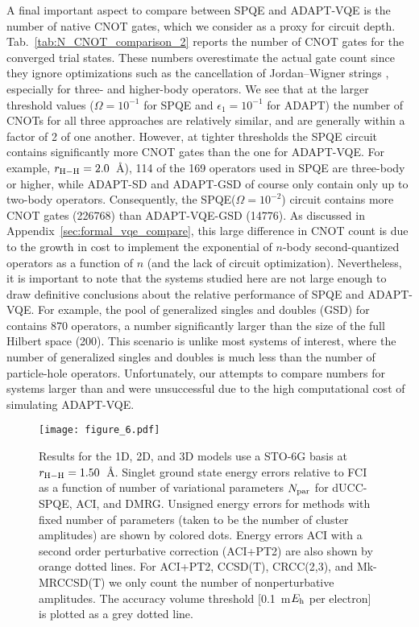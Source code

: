 \documentclass[aps,prx, reprint]{revtex4-2}
\newcommand*{\Eh}{$E_{\rm h}$\xspace}
\begin{document}
A final important aspect to compare between SPQE and ADAPT-VQE is the number of native CNOT gates, which we consider as a proxy for circuit depth.
Tab.~\ref{tab:N_CNOT_comparison_2} reports the number of CNOT gates for the converged trial states.
These numbers overestimate the actual gate count since they ignore optimizations such as the cancellation of Jordan--Wigner strings \cite{Haystings2015Improving}, especially for three- and higher-body operators.
We see that at the larger threshold values ($\Omega=10^{-1}$ for SPQE and $\epsilon_1=10^{-1}$ for ADAPT) the number of CNOTs for all three approaches are relatively similar, and are generally within a factor of 2 of one another.
However, at tighter thresholds the SPQE circuit contains significantly more CNOT gates than the one for ADAPT-VQE.
For example, $r_{\rm{H-H}} = 2.0$~{\AA}), 114 of the 169 operators used in SPQE are three-body or higher, while ADAPT-SD and ADAPT-GSD of course only contain only up to two-body operators.
Consequently, the SPQE($\Omega=10^{-2}$) circuit contains more CNOT gates (226768) than ADAPT-VQE-GSD  (14776).
As discussed in Appendix~\ref{sec:formal_vqe_compare}, this large difference in CNOT count is due to the growth in cost to implement the exponential of $n$-body second-quantized operators as a function of $n$ (and the lack of circuit optimization).
Nevertheless, it is important to note that the systems studied here are not large enough to draw definitive conclusions about the relative performance of SPQE and ADAPT-VQE.
For example, the pool of generalized singles and doubles (GSD) for  contains 870 operators, a number significantly larger than the size of the full Hilbert space (200).
This scenario is unlike most systems of interest, where the number of generalized singles and doubles is much less than the number of particle-hole operators.
Unfortunately, our attempts to compare numbers for systems larger than  and  were unsuccessful due to the high computational cost of simulating ADAPT-VQE.

\begin{figure}[h!]
\centering
\texttt{[image: figure\_6.pdf]}
\caption{Results for the 1D, 2D, and 3D  models use a STO-6G basis at $r_{\rm{H-H}}=1.50$~{\AA}. Singlet ground state energy errors relative to FCI as a function of number of variational parameters $N_{\rm{par}}$ for dUCC-SPQE, ACI, and DMRG. Unsigned energy errors for methods with fixed number of parameters (taken to be the number of cluster amplitudes) are shown by colored dots. Energy errors ACI with a second order perturbative correction (ACI+PT2) are also shown by orange dotted lines. For ACI+PT2, CCSD(T), CRCC(2,3), and Mk-MRCCSD(T) we only count the number of nonperturbative amplitudes. The accuracy volume threshold [0.1~m\Eh per electron] is plotted as a grey dotted line.}
\label{fig:H10_123D_econv}
\end{figure}
\end{document}
